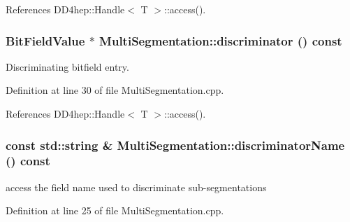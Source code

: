 References DD4hep::Handle$<$ T $>$::access().\hypertarget{class_d_d4hep_1_1_geometry_1_1_multi_segmentation_af270c789eedbe8a2a4fe830d2c43e20d}{
\subsubsection[{discriminator}]{\setlength{\rightskip}{0pt plus 5cm}BitFieldValue $\ast$ MultiSegmentation::discriminator () const}}
\label{class_d_d4hep_1_1_geometry_1_1_multi_segmentation_af270c789eedbe8a2a4fe830d2c43e20d}


Discriminating bitfield entry. 

Definition at line 30 of file MultiSegmentation.cpp.

References DD4hep::Handle$<$ T $>$::access().\hypertarget{class_d_d4hep_1_1_geometry_1_1_multi_segmentation_a21a3cade54354ef637fb9f72c19e536d}{
\subsubsection[{discriminatorName}]{\setlength{\rightskip}{0pt plus 5cm}const std::string \& MultiSegmentation::discriminatorName () const}}
\label{class_d_d4hep_1_1_geometry_1_1_multi_segmentation_a21a3cade54354ef637fb9f72c19e536d}


access the field name used to discriminate sub-\/segmentations 

Definition at line 25 of file MultiSegmentation.cpp.

